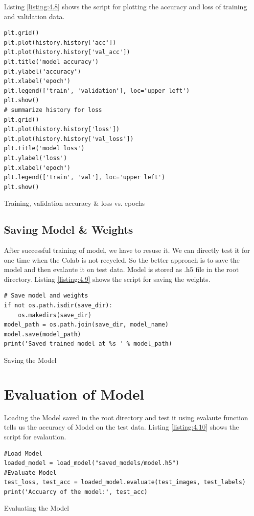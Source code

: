 Listing \ref{listing:4.8} shows the script for plotting the accuracy and
loss of training and validation data.

\begin{listing}[H]
    \begin{verbatim}
plt.grid()
plt.plot(history.history['acc'])
plt.plot(history.history['val_acc'])
plt.title('model accuracy')
plt.ylabel('accuracy')
plt.xlabel('epoch')
plt.legend(['train', 'validation'], loc='upper left')
plt.show()
# summarize history for loss
plt.grid()
plt.plot(history.history['loss'])
plt.plot(history.history['val_loss'])
plt.title('model loss')
plt.ylabel('loss')
plt.xlabel('epoch')
plt.legend(['train', 'val'], loc='upper left')
plt.show()
\end{verbatim}
\caption{Training, validation accuracy \& loss vs. epochs}
\label{listing:4.8}
\end{listing}

\subsection{Saving Model \& Weights}
After successful training of model, we have to resuse it. We can directly test it for one time
when the Colab is not recycled. So the better approach is to save the model
and then evalaute it on test data. Model is stored as .h5 file in the root directory.
Listing \ref{listing:4.9} shows the script for saving the weights.

\begin{listing}[H]
    \begin{verbatim}
# Save model and weights
if not os.path.isdir(save_dir):
    os.makedirs(save_dir)
model_path = os.path.join(save_dir, model_name)
model.save(model_path)
print('Saved trained model at %s ' % model_path)
\end{verbatim}
\caption{Saving the Model}
\label{listing:4.9}
\end{listing}
\section{Evaluation of Model}
Loading the Model saved in the root directory and test it using evalaute function
tells us the accuracy of Model on the test data. Listing \ref{listing:4.10} shows the script for
evalaution.
\begin{listing}[H]
    \begin{verbatim}
#Load Model
loaded_model = load_model("saved_models/model.h5")
#Evaluate Model
test_loss, test_acc = loaded_model.evaluate(test_images, test_labels)
print('Accuarcy of the model:', test_acc)
\end{verbatim}
\caption{Evaluating the Model}
\label{listing:4.10}
\end{listing}
